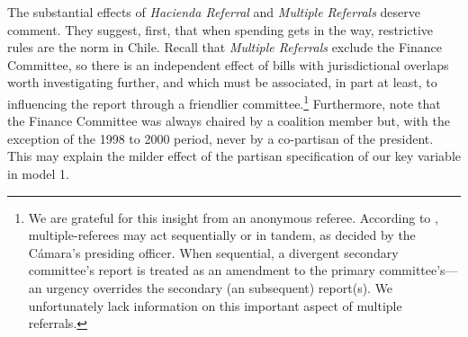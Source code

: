 \documentclass[letter,12pt]{article}
\begin{document}
The substantial effects of \emph{Hacienda Referral} and \emph{Multiple Referrals} deserve comment. They suggest, first, that when spending gets in the way, restrictive rules are the norm in Chile. Recall that \emph{Multiple Referrals} exclude the Finance Committee, so there is an independent effect of bills with jurisdictional overlaps worth investigating further, and which must be associated, in part at least, to influencing the report through a friendlier committee.\footnote{We are grateful for this insight from an anonymous referee. According to \citet[][:118]{sotoCongChile2015}, multiple-referees may act sequentially or in tandem, as decided by the Cámara's presiding officer. When sequential, a divergent secondary committee's report is treated as an amendment to the primary committee's---an urgency overrides the secondary (an subsequent) report(s). We unfortunately lack information on this important aspect of multiple referrals.} Furthermore, note that the Finance Committee was always chaired by a coalition member but, with the exception of the 1998 to 2000 period, never by a co-partisan of the president. This may explain the milder effect of the partisan specification of our key variable in model 1. 


\end{document}

